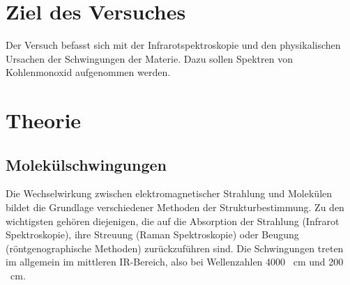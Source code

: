 \documentclass[12pt]{article}
\begin{document}
\section{Ziel des Versuches}
Der Versuch befasst sich mit der Infrarotspektroskopie und den physikalischen Ursachen der Schwingungen der Materie.
Dazu sollen Spektren von Kohlenmonoxid aufgenommen werden.
\section {Theorie\supercite{fadini}}
\subsection{Molekülschwingungen}
Die Wechselwirkung zwischen elektromagnetischer Strahlung und Molekülen
bildet die Grundlage verschiedener Methoden der Strukturbestimmung. Zu den wichtigsten
gehören diejenigen, die auf die Absorption der Strahlung (Infrarot Spektroskopie),
ihre Streuung (Raman Spektroskopie) oder Beugung (röntgenographische Methoden)
zurückzuführen sind.
Die Schwingungen treten im allgemein im mittleren IR-Bereich,
also bei Wellenzahlen 4000 \si{\per\centi\meter} und 200 \si{\per\centi\meter}.
\end{document}
